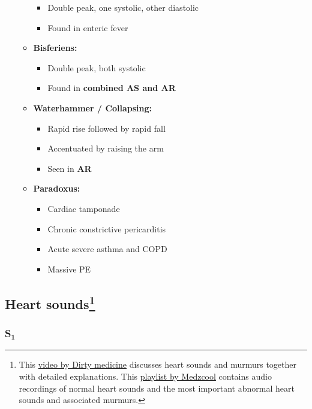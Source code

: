 \documentclass[
  12pt,
]{memoir}
\providecommand{\tightlist}{%
  \setlength{\itemsep}{0pt}\setlength{\parskip}{0pt}}
\begin{document}
\begin{itemize}
\begin{itemize}
    \begin{itemize}
    \tightlist
    \item
      Double peak, one systolic, other diastolic
    \item
      Found in enteric fever
    \end{itemize}
  \item
    \textbf{Bisferiens:}

    \begin{itemize}
    \tightlist
    \item
      Double peak, both systolic
    \item
      Found in \textbf{combined AS and AR}
    \end{itemize}
  \item
    \textbf{Waterhammer / Collapsing:}

    \begin{itemize}
    \tightlist
    \item
      Rapid rise followed by rapid fall
    \item
      Accentuated by raising the arm
    \item
      Seen in \textbf{AR}
    \end{itemize}
  \item
    \textbf{Paradoxus:}

    \begin{itemize}
    \tightlist
    \item
      Cardiac tamponade
    \item
      Chronic constrictive pericarditis
    \item
      Acute severe asthma and COPD
    \item
      Massive PE
    \end{itemize}
  \end{itemize}
\end{itemize}

\subsection[Heart sounds]{Heart sounds\footnote{This
 \href{https://youtu.be/dt9Ffu4T0Kw}{video by Dirty medicine}
 discusses heart sounds and murmurs together with detailed explanations.
 This \href{https://youtube.com/playlist?list=PL3n8cHP87ijDnqI8_5WQlS4tN37D6P4dH}
 {playlist by Medzcool} contains audio recordings of normal heart sounds
 and the most important abnormal heart sounds and associated murmurs.}}

\hypertarget{s_textbf1}{%
\subsubsection{\texorpdfstring{S\(_{\textbf{1}}\)}{S\_\{\textbackslash textbf\{1\}\}}}\label{s_textbf1}}
\end{document}
